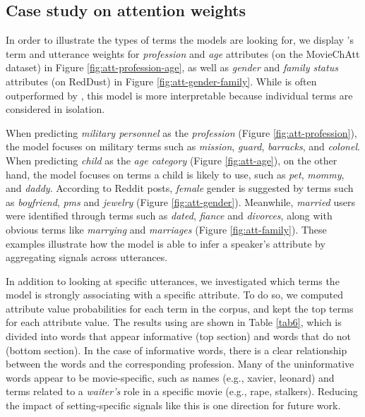\subsection{Case study on attention weights}

In order to illustrate the types of terms the models are looking for, we display 's term and utterance weights for 
\textit{profession} and \textit{age} attributes (on the MovieChAtt dataset) in Figure \ref{fig:att-profession-age}, as well as \textit{gender} and \textit{family status} attributes (on RedDust) in Figure \ref{fig:att-gender-family}.
While  is 
often outperformed by , this model is more interpretable because individual terms are considered in isolation.

When predicting \textit{military personnel} as the \textit{profession} (Figure \ref{fig:att-profession}), the model focuses on military terms such as \textit{mission}, \textit{guard}, \textit{barracks}, and \textit{colonel}.
When predicting \textit{child} as the \textit{age category} (Figure \ref{fig:att-age}), on the other hand, the model focuses on terms a child is likely to use, such as \textit{pet}, \textit{mommy}, and \textit{daddy}.
According to Reddit posts, \textit{female} gender is suggested by terms such as \textit{boyfriend}, \textit{pms} and \textit{jewelry} (Figure \ref{fig:att-gender}). Meanwhile, \textit{married} users were identified through terms such as \textit{dated}, \textit{fiance} and \textit{divorces}, along with obvious terms like \textit{marrying} and \textit{marriages} (Figure \ref{fig:att-family}). 
These examples illustrate how the model is able to infer a speaker's attribute by aggregating signals across utterances.

In addition to looking at specific utterances, we investigated which terms the model is strongly associating with a specific attribute. To do so, we computed attribute value probabilities for each term in the corpus, and kept the top terms for each attribute value. The results using  are shown in Table \ref{tab6}, which is divided into words that appear informative (top section) and words that do not (bottom section). In the case of informative words, there is a clear relationship between the words and the corresponding profession. 
Many of the uninformative words appear to be movie-specific, such as names (e.g., xavier, leonard) and terms related to a \textit{waiter's} role in a specific movie (e.g., rape, stalkers). Reducing the impact of setting-specific signals like this is one direction for future work.

